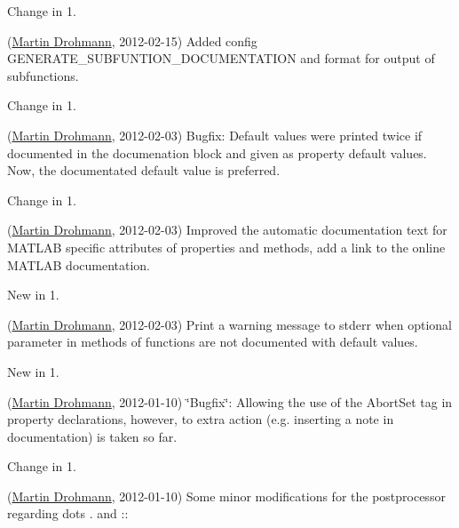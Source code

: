 \begin{DoxyRefDesc}{Change in 1.}
\item[\hyperlink{changelog1_3__changelog1_3000009}{Change in 1.\+3}](\hyperlink{developers_md}{Martin Drohmann}, 2012-\/02-\/15) Added config G\+E\+N\+E\+R\+A\+T\+E\+\_\+\+S\+U\+B\+F\+U\+N\+T\+I\+O\+N\+\_\+\+D\+O\+C\+U\+M\+E\+N\+T\+A\+T\+I\+O\+N and format for output of subfunctions.\end{DoxyRefDesc}


\begin{DoxyRefDesc}{Change in 1.}
\item[\hyperlink{changelog1_3__changelog1_3000010}{Change in 1.\+3}](\hyperlink{developers_md}{Martin Drohmann}, 2012-\/02-\/03) Bugfix\+: Default values were printed twice if documented in the documenation block and given as property default values. Now, the documentated default value is preferred.\end{DoxyRefDesc}


\begin{DoxyRefDesc}{Change in 1.}
\item[\hyperlink{changelog1_3__changelog1_3000011}{Change in 1.\+3}](\hyperlink{developers_md}{Martin Drohmann}, 2012-\/02-\/03) Improved the automatic documentation text for M\+A\+T\+L\+A\+B specific attributes of properties and methods, add a link to the online M\+A\+T\+L\+A\+B documentation.\end{DoxyRefDesc}


\begin{DoxyRefDesc}{New in 1.}
\item[\hyperlink{newfeat1_3__newfeat1_3000001}{New in 1.\+3}](\hyperlink{developers_md}{Martin Drohmann}, 2012-\/02-\/03) Print a warning message to stderr when optional parameter in methods of functions are not documented with default values.\end{DoxyRefDesc}


\begin{DoxyRefDesc}{New in 1.}
\item[\hyperlink{newfeat1_3__newfeat1_3000002}{New in 1.\+3}](\hyperlink{developers_md}{Martin Drohmann}, 2012-\/01-\/10) \char`\"{}\+Bugfix\char`\"{}\+: Allowing the use of the {\ttfamily Abort\+Set} tag in property declarations, however, to extra action (e.\+g. inserting a note in documentation) is taken so far.\end{DoxyRefDesc}


\begin{DoxyRefDesc}{Change in 1.}
\item[\hyperlink{changelog1_3__changelog1_3000012}{Change in 1.\+3}](\hyperlink{developers_md}{Martin Drohmann}, 2012-\/01-\/10) Some minor modifications for the postprocessor regarding dots \textquotesingle{}.\textquotesingle{} and \textquotesingle{}\+:\+:\textquotesingle{}\end{DoxyRefDesc}


